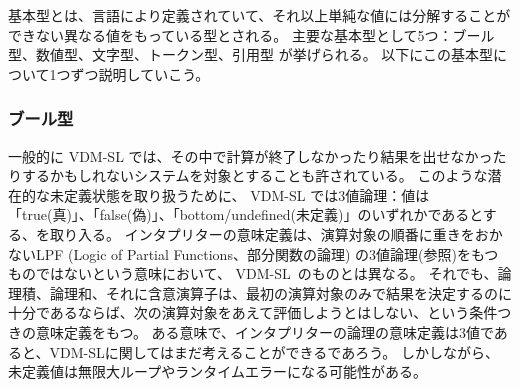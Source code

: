 \documentclass[\pformat,12pt]{jarticle}
\newcommand{\vdmslpp}[2]{%
#1
}
\newcommand{\vdmsl}{VDM-SL}
\newcommand{\vdmpp}{VDM++}
\begin{document}
基本型とは、言語により定義されていて、それ以上単純な値には分解することができない異なる値をもっている型とされる。
主要な基本型として5つ：ブール型、数値型、文字型、トークン型、引用型 が挙げられる。
以下にこの基本型について1つずつ説明していこう。

\subsubsection{ブール型}\label{bool}

一般的に \vdmslpp{\vdmsl}{\vdmpp} では、その中で計算が終了しなかったり結果を出せなかったりするかもしれないシステムを対象とすることも許されている。
このような潜在的な未定義状態を取り扱うために、\vdmslpp{\vdmsl}{\vdmpp} では3値論理：値は「true(真)」、「false(偽)」、「bottom/undefined(未定義)」のいずれかであるとする、を取り入る。
インタプリターの意味定義は、演算対象の順番に重きをおかないLPF (Logic of Partial Functions、部分関数の論理) の3値論理(\cite{Jones90a}参照)をもつものではないという意味において、 \vdmsl\ のものとは異なる。
それでも、論理積、論理和、それに含意演算子は、最初の演算対象のみで結果を決定するのに十分であるならば、次の演算対象をあえて評価しようとはしない、という条件つきの意味定義をもつ。
ある意味で、インタプリターの論理の意味定義は3値であると、VDM-SLに関してはまだ考えることができるであろう。
しかしながら、未定義値は無限大ループやランタイムエラーになる可能性がある。
\end{document}
